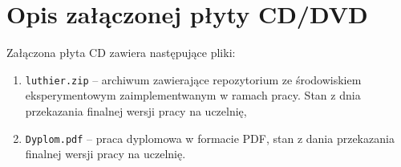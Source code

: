 \chapter{Opis załączonej płyty CD/DVD}\label{chap:opis-plyty}


Załączona płyta CD zawiera następujące pliki:

\begin{enumerate}
  \item \texttt{luthier.zip} -- archiwum zawierające repozytorium ze
    środowiskiem eksperymentowym zaimplementwanym w ramach pracy.
    Stan z dnia przekazania finalnej wersji pracy na uczelnię,
  \item \texttt{Dyplom.pdf} -- praca dyplomowa w formacie PDF,
    stan z dania przekazania finalnej wersji pracy na uczelnię.
\end{enumerate}

